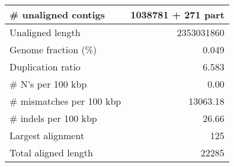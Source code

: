 \documentclass[12pt,a4paper]{article}
\begin{document}
\begin{table}[ht]
\begin{center}
\begin{tabular}{|l*{1}{|r}|}
\# unaligned contigs & 1038781 + 271 part \\ \hline
Unaligned length & 2353031860 \\ \hline
Genome fraction (\%) & 0.049 \\ \hline
Duplication ratio & 6.583 \\ \hline
\# N's per 100 kbp & 0.00 \\ \hline
\# mismatches per 100 kbp & 13063.18 \\ \hline
\# indels per 100 kbp & 26.66 \\ \hline
Largest alignment & 125 \\ \hline
Total aligned length & 22285 \\ \hline
\end{tabular}
\end{center}
\end{table}
\end{document}
